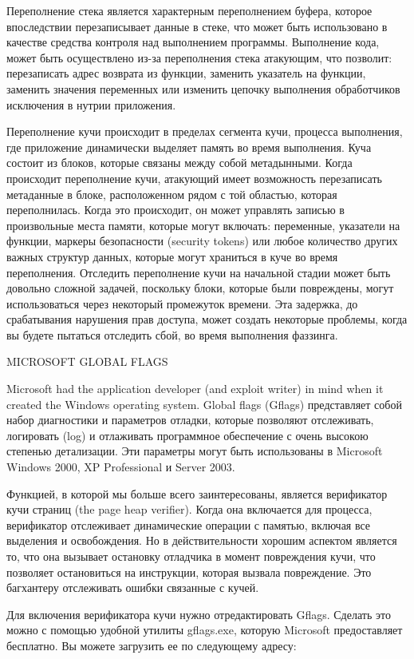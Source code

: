 \documentclass[12pt, a4paper, oneside]{book}
\begin{document}
Переполнение стека является характерным переполнением буфера, которое впоследствии перезаписывает данные в стеке, что может быть использовано в качестве средства контроля над выполнением программы. Выполнение кода, может быть осуществлено из-за переполнения стека атакующим, что позволит: перезаписать адрес возврата из функции, заменить указатель на функции, заменить значения переменных или изменить цепочку выполнения обработчиков исключения в нутрии приложения. 

Переполнение кучи происходит в пределах сегмента кучи, процесса выполнения, где приложение динамически выделяет память во время выполнения. Куча состоит из блоков, которые связаны между собой метадынными. Когда происходит переполнение кучи, атакующий имеет возможность перезаписать метаданные в блоке, расположенном рядом с той областью, которая переполнилась. Когда это происходит, он может управлять записью в произвольные места памяти, которые могут включать: переменные, указатели на функции, маркеры безопасности (security tokens) или любое количество других важных структур данных, которые могут храниться в куче во время переполнения. Отследить переполнение кучи на начальной стадии может быть довольно сложной задачей, поскольку блоки, которые были повреждены, могут использоваться через некоторый промежуток времени. Эта задержка, до срабатывания нарушения прав доступа, может создать некоторые проблемы, когда вы будете пытаться отследить сбой, во время выполнения фаззинга.

MICROSOFT GLOBAL FLAGS

Microsoft had the application developer (and exploit writer) in mind when it created the Windows operating system. Global flags (Gflags) представляет собой набор диагностики и параметров отладки, которые позволяют отслеживать, логировать (log) и отлаживать программное обеспечение с очень высокою степенью детализации. Эти параметры могут быть использованы в Microsoft Windows 2000, XP Professional и Server 2003.

Функцией, в которой мы больше всего заинтересованы, является верификатор кучи страниц (the page heap verifier). Когда она включается для процесса, верификатор отслеживает динамические операции с памятью, включая все выделения и освобождения. Но в действительности хорошим аспектом является то, что она вызывает остановку отладчика в момент повреждения кучи, что позволяет остановиться на инструкции, которая вызвала повреждение. Это багхантеру отслеживать ошибки связанные с кучей. 

Для включения верификатора кучи нужно отредактировать Gflags. Сделать это можно с помощью удобной утилиты gflags.exe, которую Microsoft предоставляет бесплатно. Вы можете загрузить ее по следующему адресу:
\end{document}
